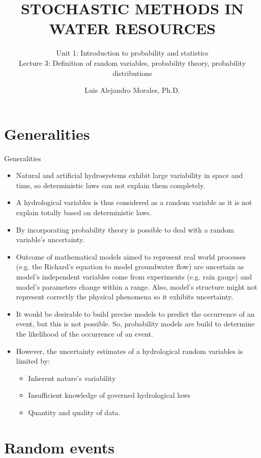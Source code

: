\documentclass[8pt]{beamer}
\title{STOCHASTIC METHODS IN WATER RESOURCES}
\subtitle{Unit 1: Introduction to probability and statistics \\ Lecture 3: Definition of random variables, probability theory, probability distributions}
\author{Luis Alejandro Morales, Ph.D.}
\institute{Universidad Nacional de Colombia \\ Department of Civil and Agriculture Engineering} %
\renewcommand{\emph}[1]{\textcolor{myorange}{#1}}
\begin{document}
\begin{frame}
    \titlepage
\end{frame}

\section{Generalities}
\begin{frame}{Generalities}
    \begin{itemize}
        \item Natural and artificial hydrosystems exhibit large variability in space and time, so deterministic laws can not explain them completely.
        \item A hydrological variables is thus considered as a \alert{random variable} as it is not explain totally based on \emph{deterministic laws}. 
        \item By incorporating \emph{probability theory} is possible to deal with a random variable's uncertainty. 
        \item Outcome of mathematical models aimed to represent real world processes (e.g. the Richard's equation to model groundwater flow) are uncertain as  model's independent variables come from experiments (e.g. rain gauge) and model's parameters change within a range. Also,  model's structure might not represent correctly the physical phenomena so it exhibits uncertainty. 
        \item It would be desirable to build precise models to predict the occurrence of an event, but this is not possible. So, probability models are build to determine the likelihood of the occurrence of an event. 
        \item However, the uncertainty estimates of a hydrological random variables is limited by:
            \begin{itemize}
                \item Inherent nature's variability
                \item Insufficient knowledge of governed hydrological laws
                \item Quantity and quality of data.
            \end{itemize}
    \end{itemize}
\end{frame}

\section{Random events}
\end{document}
